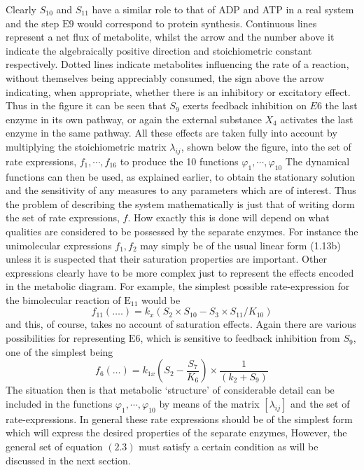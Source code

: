 Clearly $S_{10}$ and $S_{11}$ have a similar role to that of ADP and ATP in a real system and the step $\mathrm{E} 9$ would correspond to protein synthesis. Continuous lines represent a net flux of metabolite, whilst the arrow and the number above it indicate the algebraically positive direction and stoichiometric constant respectively. Dotted lines indicate metabolites influencing the rate of a reaction, without themselves being appreciably consumed, the sign above the arrow indicating, when appropriate, whether there is an inhibitory or excitatory effect. Thus in the figure it can be seen that $S_{9}$ exerts feedback inhibition on $E 6$ the last enzyme in its own pathway, or again the external substance $X_{4}$ activates the last enzyme in the same pathway. All these effects are taken fully into account by multiplying the stoichiometric matrix $\lambda_{i j}$, shown below the figure, into the set of rate expressions, $f_{1}, \cdots, f_{16}$ to produce the 10 functions $\varphi_{1}, \cdots, \varphi_{10}$ The dynamical functions can then be used, as explained earlier, to obtain the stationary solution and the sensitivity of any measures to any parameters which are of interest. Thus the problem of describing the system mathematically is just that of writing dorm the set of rate expressions, $f$. How exactly this is done will depend on what qualities are considered to be possessed by the separate enzymes. For instance the unimolecular expressions $f_{1}, f_{2}$ may simply be of the usual linear form (1.13b) unless it is suspected that their saturation properties are important. Other expressions clearly have to be more complex just to represent the effects encoded in the metabolic diagram. For example, the simplest possible rate-expression for the bimolecular reaction of $\mathrm{E}_{11}$ would be
%
$$
f_{11}(\ldots .)=k_{x}\left(S_{2} \times S_{10} - S_{3} \times S_{11} /K_{10}\right)
$$
%
and this, of course, takes no account of saturation effects. Again there are various possibilities for representing $\mathrm{E} 6$, which is sensitive to feedback inhibition from $S_{9}$, one of the simplest being
%
$$
f_{6}(\ldots)=k_{1 x}\left(S_{2} - \frac{S_{7}}{K_{6}}\right) \times \frac{1}{\left(k_{2} + S_{9}\right)}
$$
%
The situation then is that metabolic `structure' of considerable detail can be included in the functions $\varphi_{1}, \cdots, \varphi_{10}$ by means of the matrix $\left[\lambda_{i j}\right]$ and the set of rate-expressions. In general these rate expressions should be of the simplest form which will express the desired properties of the separate enzymes, However, the general set of equation $(2.3)$ must satisfy a certain condition as will be discussed in the next section.

